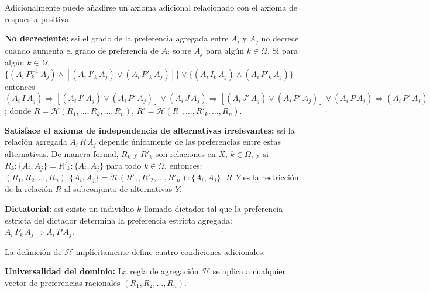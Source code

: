 \documentclass[a5paper,doc,10pt,noapacite]{apa6}
\begin{document}
{{\begin{APAenumerate}
    Adicionalmente puede añadirse un axioma adicional relacionado con el axioma de respuesta positiva. 
    
        \begin{APAitemize}
            \item \textbf{No decreciente:} ssi el grado de la preferencia agregada entre \(A_i\) y \(A_j\) no decrece cuando aumenta el grado de preferencia de \(A_i\) sobre \(A_j\) para algún \(k \in \Omega\). Si para algún \(k \in \Omega\), \(\{(A_i \, P_k^{-1} \, A_j) \wedge [(A_i \, I'_k \, A_j) \vee (A_i \, P'_k \, A_j)]\} \vee \{(A_i \, I_k \, A_j) \wedge (A_i \, P'_k \, A_j)\}\)  entonces \((A_i \, I \, A_j) \Rightarrow [(A_i \, I' \, A_j) \vee (A_i \, P' \, A_j)] \vee (A_i \, J \, A_j) \Rightarrow [(A_i \, J' \, A_j) \vee (A_i \, P' \, A_j)] \vee (A_i \, P \, A_j) \Rightarrow (A_i \, P' \, A_j)\); donde \(R = \mathcal{H}(R_1, \dots, R_k, \dots, R_n) \), \(R' = \mathcal{H}(R_1, \dots, R'_k, \dots, R_n)\).
        \end{APAitemize}
    
    \vspace{1\baselineskip}
    \item \textbf{Satisface el axioma de independencia de alternativas irrelevantes:} ssi la relación agregada \(A_i \, R \, A_j\) depende únicamente de las preferencias entre estas alternativas. De manera formal, \(R_k\) y \(R'_k\) son relaciones en \(X\), \(k \in \Omega\), y si \(R_k : \{A_i, A_j\} = R'_k : \{A_i, A_j\}\) para todo \(k \in \Omega\), entonces: \((R_1, R_2, \dots, R_n) : \{A_i, A_j\}  = \mathcal{H}(R'_1,  R'_2, \dots, R'_n) : \{A_i, A_j\} \). \(R : Y\) es la restricción de la relación \(R\) al subconjunto de alternativas \(Y\).
    
    \vspace{1\baselineskip}
    \item \textbf{Dictatorial:} ssi existe un individuo \(k\) llamado dictador tal que la preferencia estricta del dictador determina la preferencia estricta agregada: \(A_i \, P_k \, A_j \Rightarrow A_i \, P \, A_j\).
    
    
    La definición de \(\mathcal{H}\) implícitamente define cuatro condiciones adicionales:
    
    \vspace{1\baselineskip}
    \item \textbf{Universalidad del dominio:} La regla de agregación \(\mathcal{H}\) se aplica a cualquier vector de preferencias racionales \((R_1, R_2, \dots, R_n).\)
    

\end{APAenumerate}}}
\end{document}
